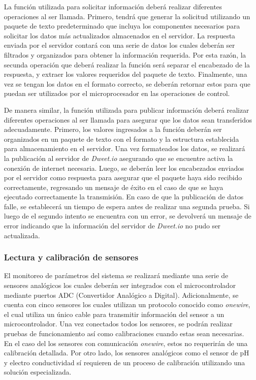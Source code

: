 La función utilizada para solicitar información deberá realizar diferentes operaciones al ser llamada. Primero, tendrá que generar la solicitud utilizando un paquete de texto predeterminado que incluya los componentes necesarios para solicitar los datos más actualizados almacenados en el servidor. La respuesta enviada por el servidor contará con una serie de datos los cuales deberán ser filtrados y organizados para obtener la información requerida. Por esta razón, la secunda operación que deberá realizar la función será separar el encabezado de la respuesta, y extraer los valores requeridos del paquete de texto. Finalmente, una vez se tengan los datos en el formato correcto, se deberán retornar estos para que puedan ser utilizados por el microprocesador en las operaciones de control.

De manera similar, la función utilizada para publicar información deberá realizar diferentes operaciones al ser llamada para asegurar que los datos sean transferidos adecuadamente. Primero, los valores ingresados a la función deberán ser organizados en un paquete de texto con el formato y la estructura establecida para almacenamiento en el servidor. Una vez formateados los datos, se realizará la publicación al servidor de \textit{Dweet.io} asegurando que se encuentre activa la conexión de internet necesaria. Luego, se deberán leer los encabezados enviados por el servidor como respuesta para asegurar que el paquete haya sido recibido correctamente, regresando un mensaje de éxito en el caso de que se haya ejecutado correctamente la transmisión. En caso de que la publicación de datos falle, se establecerá un tiempo de espera antes de realizar una segunda prueba. Si luego de el segundo intento se encuentra con un error, se devolverá un mensaje de error indicando que la información del servidor de \textit{Dweet.io} no pudo ser actualizada.

\subsubsection{Lectura y calibración de sensores}
El monitoreo de parámetros del sistema se realizará mediante una serie de sensores analógicos los cuales deberán ser integrados con el microcontrolador mediante puertos ADC (Convertidor Analógico a Digital). Adicionalmente, se cuenta con cinco sensores los cuales utilizan un protocolo conocido como \textit{onewire}, el cual utiliza un único cable para transmitir información del sensor a un microcontrolador. Una vez conectados todos los sensores, se podrán realizar pruebas de funcionamiento así como calibraciones cuando estas sean necesarias. En el caso del los sensores con comunicación \textit{onewire}, estos no requerirán de una calibración detallada. Por otro lado, los sensores analógicos como el sensor de pH y electro conductividad sí requieren de un proceso de calibración utilizando una solución especializada.

